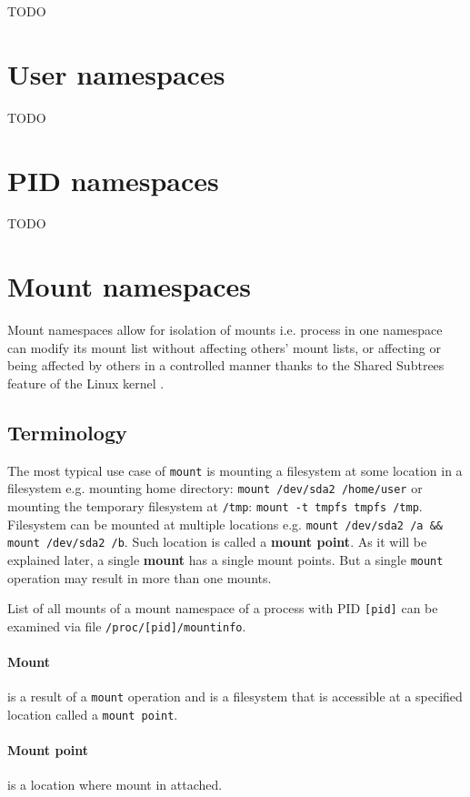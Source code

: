 \documentclass[licencjacka,en]{pracamgr}
\begin{document}
TODO

\section{User namespaces}
TODO

\section{PID namespaces}
TODO

\section{Mount namespaces}

Mount namespaces allow for isolation of mounts i.e. process in one namespace can modify its mount list without affecting others' mount lists, or affecting or being affected by others in a controlled manner thanks to the Shared Subtrees feature of the Linux kernel \cite{shared_subtree}.

\subsection{Terminology}

The most typical use case of \texttt{mount} is mounting a filesystem at some location in a filesystem e.g. mounting home directory: \texttt{mount /dev/sda2 /home/user} or mounting the temporary filesystem at \texttt{/tmp}: \texttt{mount -t tmpfs tmpfs /tmp}. Filesystem can be mounted at multiple locations e.g. \texttt{mount /dev/sda2 /a \&\& mount /dev/sda2 /b}. Such location is called a \textbf{mount point}. As it will be explained later, a single \textbf{mount} has a single mount points. But a single \texttt{mount} operation may result in more than one mounts.

List of all mounts of a mount namespace of a process with PID \texttt{[pid]} can be examined via file \texttt{/proc/[pid]/mountinfo}.

\paragraph{Mount} is a result of a \texttt{mount} operation and is a filesystem that is accessible at a specified location called a \texttt{mount point}.

\paragraph{Mount point} is a location where mount in attached.
\end{document}
